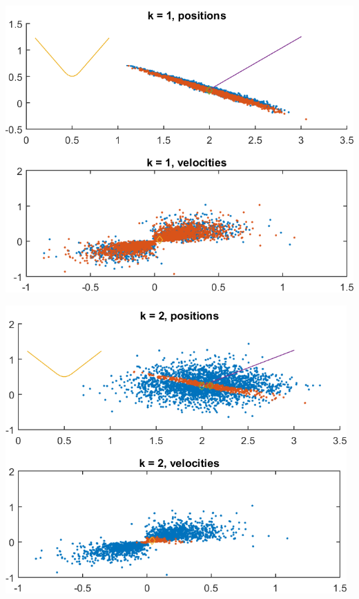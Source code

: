 \documentclass[english,DIV=13]{scrartcl}
\begin{document}
\begin{center}
	\begin{minipage}{.5\textwidth}
		 \includegraphics[width=.98\textwidth]{img/q4_1.png}
	\end{minipage}%
	\begin{minipage}{.5\textwidth}
		\includegraphics[width=0.98\textwidth]{img/q4_2.png}
	\end{minipage}
\end{center}
\end{document}

